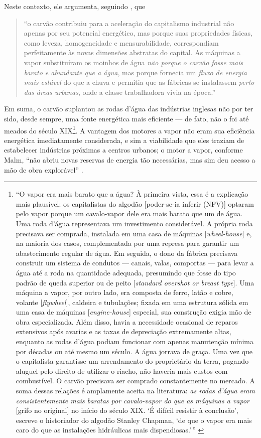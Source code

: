 \documentclass[12pt]{article}
\numberwithin{equation}{section}
\theoremstyle{plain}
\theoremstyle{definition}
\theoremstyle{remark}
\begin{document}
Neste contexto, ele argumenta, seguindo \textcite{Malm2016}, que

\begin{quote}
``o carvão contribuiu para a aceleração do capitalismo industrial não apenas por seu potencial energético, mas porque suas propriedades físicas, como leveza, homogeneidade e mensurabilidade, correspondiam perfeitamente às novas dimensões abstratas do capital. As máquinas a vapor substituíram os moinhos de água \emph{não porque o carvão fosse mais barato e abundante que a água}, mas porque fornecia um \emph{fluxo de energia mais estável} do que a chuva e permitia que as fábricas se instalassem \emph{perto das áreas urbanas}, onde a classe trabalhadora vivia na época.'' \parencite[p. 122-3, grifo meu]{Pasquinelli2023}
\end{quote}

Em suma, o carvão suplantou as rodas d'água das indústrias inglesas não por ter sido, desde sempre, uma fonte energética mais eficiente --- de fato, não o foi até meados do século XIX\footnote{``O vapor era mais barato que a água? À primeira vista, essa é a explicação mais plausível: os capitalistas do algodão {[}poder-se-ia inferir (NFV){]} optaram pelo vapor porque um cavalo-vapor dele era mais barato que um de água. Uma roda d'água representava um investimento considerável. A própria roda precisava ser comprada, instalada em uma casa de máquinas {[}\emph{wheel-house}{]} e, na maioria dos casos, complementada por uma represa para garantir um abastecimento regular de água. Em seguida, o dono da fábrica precisava construir um sistema de condutos --- canais, valas, comportas --- para levar a água até a roda na quantidade adequada, presumindo que fosse do tipo padrão de queda superior ou de peito {[}\emph{standard overshot or breast type}{]}. Uma máquina a vapor, por outro lado, era composta de ferro, latão e cobre, volante {[}\emph{flywheel}{]}, caldeira e tubulações; fixada em uma estrutura sólida em uma casa de máquinas {[}\emph{engine-house}{]} especial, sua construção exigia mão de obra especializada. Além disso, havia a necessidade ocasional de reparos extensivos após avarias e as taxas de depreciação extremamente altas, enquanto as rodas d'água podiam funcionar com apenas manutenção mínima por décadas ou até mesmo um século. A água jorrava de graça. Uma vez que o capitalista garantisse um arrendamento do proprietário da terra, pagando aluguel pelo direito de utilizar o riacho, não haveria mais custos com combustível. O carvão precisava ser comprado constantemente no mercado. A soma dessas relações é amplamente aceita na literatura: \emph{as rodas d'água eram consistentemente mais baratas por cavalo-vapor do que as máquinas a vapor} {[}grifo no original{]} no início do século XIX. `É difícil resistir à conclusão', escreve o historiador do algodão Stanley Chapman, `de que o vapor era mais caro do que as instalações hidráulicas mais dispendiosas.'\,'' \parencite[p. 29-30]{Malm2013}}. A vantagem dos motores a vapor não eram sua eficiência energética imediatamente considerada, e sim a viabilidade que eles traziam de estabelecer indústrias próximas a centros urbanos; o motor a vapor, conforme Malm, ``não abriu novas reservas de energia tão necessárias, mas sim deu acesso a mão de obra explorável'' \parencite[p. 33]{Malm2013}.
\end{document}
